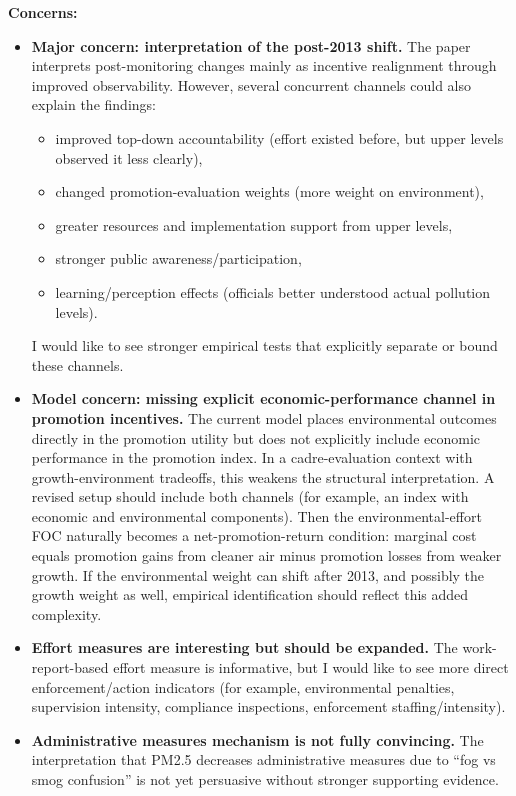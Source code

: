 \documentclass[12pt]{article}
\begin{document}
\noindent \textbf{Concerns:}
\begin{itemize}
    \item \textbf{Major concern: interpretation of the post-2013 shift.}
    The paper interprets post-monitoring changes mainly as incentive realignment through improved observability. However, several concurrent channels could also explain the findings:
    \begin{itemize}
        \item improved top-down accountability (effort existed before, but upper levels observed it less clearly),
        \item changed promotion-evaluation weights (more weight on environment),
        \item greater resources and implementation support from upper levels,
        \item stronger public awareness/participation,
        \item learning/perception effects (officials better understood actual pollution levels).
    \end{itemize}
    I would like to see stronger empirical tests that explicitly separate or bound these channels.

    \item \textbf{Model concern: missing explicit economic-performance channel in promotion incentives.}
    The current model places environmental outcomes directly in the promotion utility but does not explicitly include economic performance in the promotion index. In a cadre-evaluation context with growth-environment tradeoffs, this weakens the structural interpretation. A revised setup should include both channels (for example, an index with economic and environmental components). Then the environmental-effort FOC naturally becomes a net-promotion-return condition: marginal cost equals promotion gains from cleaner air minus promotion losses from weaker growth. If the environmental weight can shift after 2013, and possibly the growth weight as well, empirical identification should reflect this added complexity.

    \item \textbf{Effort measures are interesting but should be expanded.}
    The work-report-based effort measure is informative, but I would like to see more direct enforcement/action indicators (for example, environmental penalties, supervision intensity, compliance inspections, enforcement staffing/intensity).

    \item \textbf{Administrative measures mechanism is not fully convincing.}
    The interpretation that PM2.5 decreases administrative measures due to ``fog vs smog confusion'' is not yet persuasive without stronger supporting evidence.


\end{itemize}
\end{document}
